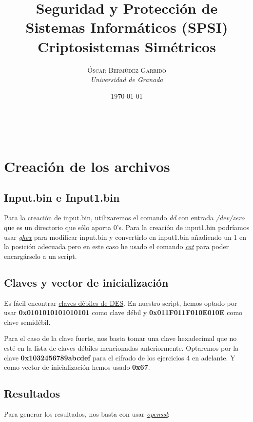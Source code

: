 \documentclass[a4paper, 11pt]{article}
\title{\textbf{Seguridad y Protección de Sistemas Informáticos (SPSI)}\\ %
Criptosistemas Simétricos} %
\author{\textsc{Óscar Bermúdez Garrido} %
\\{\textit{Universidad de Granada}}} %
\date{\today} %
\makeatletter
\renewcommand{\maketitle}{
  \begin{flushright} %
  
  {\LARGE\@title} %
  
  \vspace{50pt} %
  
  {\large\@author} %
  \\\@date %
  \vspace{40pt} %
  \end{flushright}
}
\makeatother
\begin{document}
\maketitle %

\renewcommand{\abstractname}{Resumen} %

{\parskip=2pt
  \tableofcontents
}
\pagebreak


\section{Creación de los archivos}
	\subsection{Input.bin e Input1.bin}
		Para la creación de input.bin, utilizaremos el comando \href{http://manpages.ubuntu.com/manpages/zesty/en/man1/dd.1.html}
		{\textit{dd}} con entrada \textit{/dev/zero} que es un directorio que sólo aporta 0's. Para la creación de input1.bin
		podríamos usar \href{http://manpages.ubuntu.com/manpages/zesty/en/man1/ghex.1.html}{\textit{ghex}} para modificar
		input.bin y convertirlo en input1.bin añadiendo un 1 en la posición adecuada pero en este caso he usado el comando
		\href{http://manpages.ubuntu.com/manpages/zesty/en/man1/cat.1.html}{\textit{cat}} para poder encargárselo a un script.
		
	\subsection{Claves y vector de inicialización}
		Es fácil encontrar \href{https://en.wikipedia.org/wiki/Weak_key#Weak_keys_in_DES}{claves débiles de DES}. En nuestro
		script, hemos optado por usar \textbf{0x0101010101010101} como clave débil y \textbf{0x011F011F010E010E} como clave
		semidébil.
		
		Para el caso de la clave fuerte, nos basta tomar una clave hexadecimal que no esté en la lista de claves débiles
		mencionadas anteriormente. Optaremos por la clave \textbf{0x1032456789abcdef} %
		para el cifrado de los ejercicios 4 en adelante. Y como vector de inicialización hemos usado \textbf{0x67}. %

	\subsection{Resultados}
		Para generar los resultados, nos basta con usar \href{http://manpages.ubuntu.com/manpages/zesty/en/man1/openssl.1ssl.html}
		{\textit{openssl}}:
		
\end{document}
